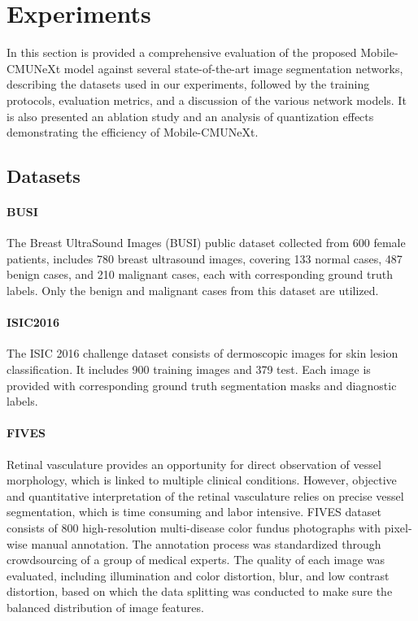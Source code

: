 \documentclass[lettersize,journal]{IEEEtran}
\begin{document}
\section{Experiments}
In this section is provided a comprehensive evaluation of the proposed Mobile-CMUNeXt model against several state-of-the-art image segmentation networks, describing the datasets used in our experiments, followed by the training protocols, evaluation metrics, and a discussion of the various network models. It is also presented an ablation study and an analysis of quantization effects demonstrating the efficiency of Mobile-CMUNeXt.


\subsection{Datasets}

\paragraph{BUSI} The Breast UltraSound Images (BUSI) \cite{al2020dataset} public dataset collected from 600 female patients, includes 780 breast ultrasound images, covering 133 normal cases, 487 benign cases, and 210 malignant cases, each with corresponding ground truth labels. Only the benign and malignant cases from this dataset are utilized.

\paragraph{ISIC2016} The ISIC 2016 \cite{isic2016dataset} challenge dataset consists of dermoscopic images for skin lesion classification. It includes 900 training images and 379 test. Each image is provided with corresponding ground truth segmentation masks and diagnostic labels.

\paragraph{FIVES} Retinal vasculature provides an opportunity for direct observation of vessel morphology, which is linked to multiple clinical conditions. However, objective and quantitative interpretation of the retinal vasculature relies on precise vessel segmentation, which is time consuming and labor intensive. FIVES \cite{jin2022fives} dataset consists of 800 high-resolution multi-disease color fundus photographs with pixel-wise manual annotation. The annotation process was standardized through crowdsourcing of a group of medical experts. The quality of each image was evaluated, including illumination and color distortion, blur, and low contrast distortion, based on which the data splitting was conducted to make sure the balanced distribution of image features.
\end{document}
